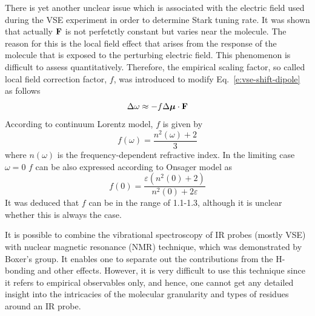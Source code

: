 \documentclass[a4paper,titlepage,twoside,fleqn,12pt]{book}
\newcommand{\BM}[1]{\ensuremath{\mbox{\boldmath${#1}$}}}
\begin{document}
\begin{refsection}
There is yet another unclear issue which is associated with the electric field
used during the VSE experiment in order to determine Stark tuning rate.
It was shown that actually ${\bf F}$ is not perfetctly constant but varies
near the molecule. The reason for this is the local field effect that arises
from the response of the molecule that is exposed to the perturbing electric field.
This phenomenon is difficult to assess quantitatively. Therefore, 
the empirical scaling factor, so called local field correction factor, $f$, 
was introduced to modify Eq.~\eqref{e:vse-shift-dipole} as follows
%
\begin{equation} \label{e:vse-shift-dipole-corr}
 \Delta \omega \approx - f \Delta {\BM \mu} \cdot {\bf F}
\end{equation}
%
According to continuum Lorentz model, $f$ is given by\citep{Wortmann.Bishop.JCP.1998}
%
\begin{equation}
f(\omega) = \frac{n^2(\omega)+2}{3}
\end{equation}
%
where $n(\omega)$ is the frequency\hyp{}dependent refractive index.
In the limiting case $\omega=0$ $f$ can be also expressed according to Onsager
model as\citep{Wortmann.Bishop.JCP.1998}
%
\begin{equation}
f(0) = \frac{\varepsilon (n^2(0)+2)}{n^2(0)+2\varepsilon}
\end{equation}
%
It was deduced that $f$ can be in the range of 1.1-1.3\citep{Wortmann.Bishop.JCP.1998,
Bublitz.Boxer.AnnuRevPhysChem.1997}, although
it is unclear whether this is always the case.

It is possible to combine the vibrational spectroscopy of IR probes (mostly VSE) with nuclear magnetic 
resonance (NMR) technique, which was demonstrated by Boxer's 
group.\citep{Fafarman.Sigala.Herschlag.Boxer.JACS.2010,Bagchi.Fried.Boxer.JACS.2012} 
It enables one
to separate out the contributions from the H\hyp{}bonding and other effects. However, 
it is very difficult to use this technique since it refers to empirical observables only,
and hence, one cannot get any detailed insight into the intricacies of the molecular granularity
and types of residues around an IR probe.


\end{refsection}
\end{document}
